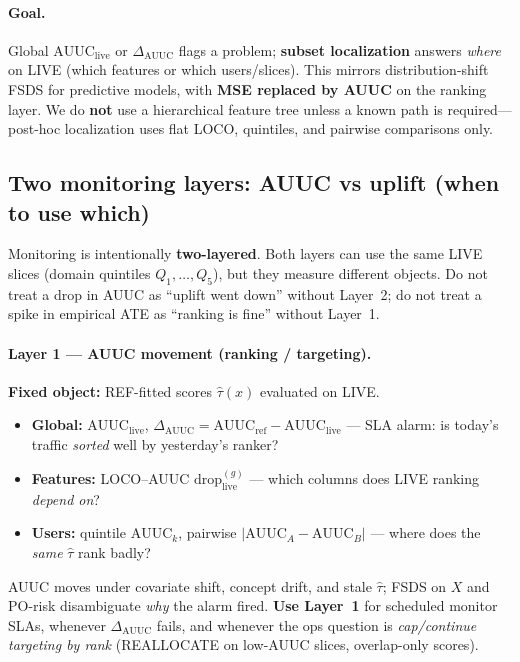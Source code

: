 \paragraph{Goal.}
Global $\mathrm{AUUC}_{\mathrm{live}}$ or $\Delta_{\mathrm{AUUC}}$ flags a problem; \textbf{subset localization} answers \emph{where} on LIVE (which features or which users/slices).
This mirrors distribution-shift FSDS for predictive models, with \textbf{MSE replaced by AUUC} on the ranking layer.
We do \textbf{not} use a hierarchical feature tree unless a known path is required---post-hoc localization uses flat LOCO, quintiles, and pairwise comparisons only.

\subsection{Two monitoring layers: AUUC vs uplift (when to use which)}

Monitoring is intentionally \textbf{two-layered}. Both layers can use the same LIVE slices (domain quintiles $Q_1,\ldots,Q_5$), but they measure different objects.
Do not treat a drop in AUUC as ``uplift went down'' without Layer~2; do not treat a spike in empirical ATE as ``ranking is fine'' without Layer~1.

\paragraph{Layer 1 --- AUUC movement (ranking / targeting).}
\textbf{Fixed object:} REF-fitted scores $\hat\tau(x)$ evaluated on LIVE.
\begin{itemize}
  \item \textbf{Global:} $\mathrm{AUUC}_{\mathrm{live}}$, $\Delta_{\mathrm{AUUC}}=\mathrm{AUUC}_{\mathrm{ref}}-\mathrm{AUUC}_{\mathrm{live}}$ --- SLA alarm: is today's traffic \emph{sorted} well by yesterday's ranker?
  \item \textbf{Features:} LOCO--AUUC $\mathrm{drop}_{\mathrm{live}}^{(g)}$ --- which columns does LIVE ranking \emph{depend on}?
  \item \textbf{Users:} quintile $\mathrm{AUUC}_k$, pairwise $|\mathrm{AUUC}_A-\mathrm{AUUC}_B|$ --- where does the \emph{same} $\hat\tau$ rank badly?
\end{itemize}
AUUC moves under covariate shift, concept drift, and stale $\hat\tau$; FSDS on $X$ and PO-risk disambiguate \emph{why} the alarm fired.
\textbf{Use Layer~1} for scheduled monitor SLAs, whenever $\Delta_{\mathrm{AUUC}}$ fails, and whenever the ops question is \emph{cap/continue targeting by rank} (REALLOCATE on low-AUUC slices, overlap-only scores).

